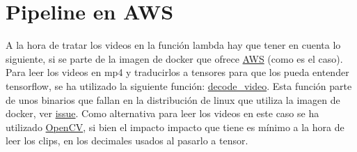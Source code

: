 \section{Pipeline en AWS}

A la hora de tratar los videos en la función lambda hay que tener en cuenta lo siguiente, si se parte de la imagen de docker que ofrece \href{https://hub.docker.com/r/amazon/aws-lambda-python}{AWS} (como es el caso). Para leer los videos en mp4 y traducirlos a tensores para que los pueda entender tensorflow, se ha utilizado la siguiente función: \href{https://www.tensorflow.org/io/api_docs/python/tfio/experimental/ffmpeg/decode_video}{decode\_video}. Esta función parte de unos binarios que fallan en la distribución de linux que utiliza la imagen de docker, ver \href{https://github.com/tensorflow/io/issues/1648}{issue}. Como alternativa para leer los videos en este caso se ha utilizado \href{https://pypi.org/project/opencv-python-headless/}{OpenCV}, si bien el impacto impacto que tiene es mínimo a la hora de leer los clips, en los decimales usados al pasarlo a tensor.
